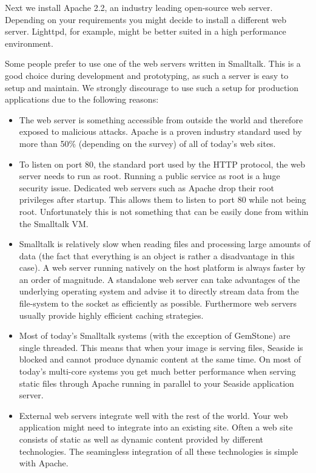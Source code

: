 \documentclass[a4paper,10pt,twoside]{book}
\begin{document}
Next we install Apache 2.2, an industry leading open-source web server. Depending on your requirements you might decide to install a different web server. Lighttpd, for example, might be better suited in a high performance environment.

Some people prefer to use one of the web servers written in Smalltalk. This is a good choice during development and prototyping, as such a server is easy to setup and maintain. We strongly discourage to use such a setup for production applications due to the following reasons:
 

\begin{itemize}
\item  The web server is something accessible from outside the world and therefore exposed to malicious attacks. Apache is a proven industry standard used by more than 50\% (depending on the survey) of all of today's web sites.
\item  To listen on port 80, the standard port used by the HTTP protocol, the web server needs to run as root. Running a public service as root is a huge security issue. Dedicated web servers such as Apache drop their root privileges after startup. This allows them to listen to port 80 while not being root. Unfortunately this is not something that can be easily done from within the Smalltalk VM.
\item  Smalltalk is relatively slow when reading files and processing large amounts of data (the fact that everything is an object is rather a disadvantage in this case). A web server running natively on the host platform is always faster by an  order of magnitude. A standalone web server can take advantages of the underlying operating system and advise it to directly stream data from the file-system to the socket as efficiently as possible. Furthermore web servers usually provide highly efficient caching strategies.
\item  Most of today's Smalltalk systems (with the exception of GemStone) are single threaded. This means that when your image is serving files, Seaside is blocked and cannot produce dynamic content at the same time. On most of today's multi-core systems you get much better performance when serving static files through Apache running in parallel to your Seaside application server.
\item  External web servers integrate well with the rest of the world. Your web application might need to integrate into an existing site. Often a web site consists of static as well as dynamic content provided by different technologies. The seamingless integration of all these technologies is simple with Apache.
\end{itemize}
\end{document}
